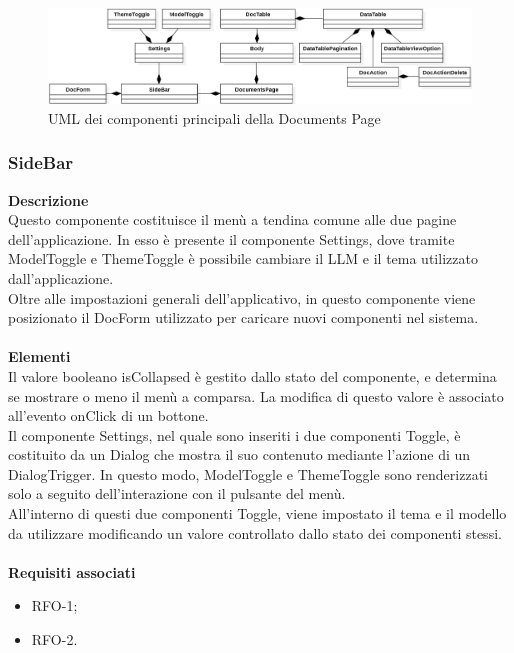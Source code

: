 \begin{figure}[h!]
    \centering  
    \includegraphics[width=\textwidth]{DocumentPageView.png}
    \caption{UML dei componenti principali della Documents Page}
\end{figure}

\subsubsection{SideBar}

\textbf{Descrizione}\\
Questo componente costituisce il menù a tendina comune alle due pagine dell'applicazione. In esso è presente il componente Settings, dove tramite ModelToggle e ThemeToggle è possibile cambiare il LLM e il tema utilizzato dall'applicazione.\\
Oltre alle impostazioni generali dell'applicativo, in questo componente viene posizionato il DocForm utilizzato per caricare nuovi componenti nel sistema.\\ \\
\textbf{Elementi}\\
Il valore booleano isCollapsed è gestito dallo stato del componente, e determina se mostrare o meno il menù a comparsa. La modifica di questo valore è associato all'evento onClick di un bottone.\\
Il componente Settings, nel quale sono inseriti i due componenti Toggle, è costituito da un Dialog che mostra il suo contenuto mediante l'azione di un DialogTrigger. In questo modo, ModelToggle e ThemeToggle sono renderizzati solo a seguito dell'interazione con il pulsante del menù.\\
All'interno di questi due componenti Toggle, viene impostato il tema e il modello da utilizzare modificando un valore controllato dallo stato dei componenti stessi.\\ \\
\textbf{Requisiti associati}
\begin{itemize}[itemsep=-4pt]
    \item RFO-1;
    \item RFO-2.
\end{itemize}

